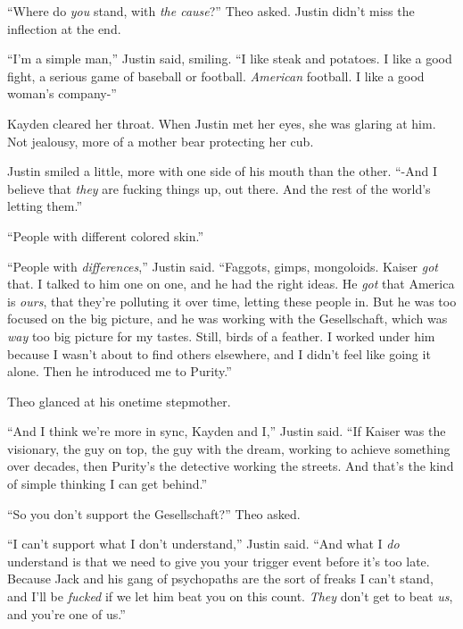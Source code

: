 ``Where do \emph{you} stand, with \emph{the cause}?''  Theo asked.  Justin didn't miss the inflection at the end.



``I'm a simple man,'' Justin said, smiling.  ``I like steak and potatoes.  I like a good fight, a serious game of baseball or football.  \emph{American} football.  I like a good woman's company-''



Kayden cleared her throat.  When Justin met her eyes, she was glaring at him.  Not jealousy, more of a mother bear protecting her cub.



Justin smiled a little, more with one side of his mouth than the other.  ``-And I believe that \emph{they} are fucking things up, out there.  And the rest of the world's letting them.''



``People with different colored skin.''



``People with \emph{differences},'' Justin said.  ``Faggots, gimps, mongoloids.  Kaiser \emph{got} that.  I talked to him one on one, and he had the right ideas.  He \emph{got} that America is \emph{ours}, that they're polluting it over time, letting these people in.  But he was too focused on the big picture, and he was working with the Gesellschaft, which was \emph{way} too big picture for my tastes.  Still, birds of a feather.  I worked under him because I wasn't about to find others elsewhere, and I didn't feel like going it alone.  Then he introduced me to Purity.''



Theo glanced at his onetime stepmother.



``And I think we're more in sync, Kayden and I,'' Justin said.  ``If Kaiser was the visionary, the guy on top, the guy with the dream, working to achieve something over decades, then Purity's the detective working the streets.  And that's the kind of simple thinking I can get behind.''



``So you don't support the Gesellschaft?''  Theo asked.



``I can't support what I don't understand,'' Justin said.  ``And what I \emph{do} understand is that we need to give you your trigger event before it's too late.  Because Jack and his gang of psychopaths are the sort of freaks I can't stand, and I'll be \emph{fucked} if we let him beat you on this count.  \emph{They} don't get to beat \emph{us}, and you're one of us.''



